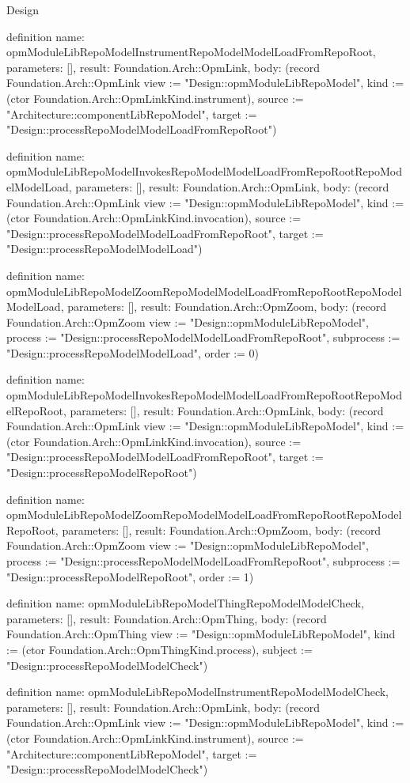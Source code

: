 \begin{lexlean}{Design}
\begin{semanticmodule}
definition{
  name: opmModuleLibRepoModelInstrumentRepoModelModelLoadFromRepoRoot,
  parameters: [],
  result: Foundation.Arch::OpmLink,
  body: (record Foundation.Arch::OpmLink {view := "Design::opmModuleLibRepoModel", kind := (ctor Foundation.Arch::OpmLinkKind.instrument), source := "Architecture::componentLibRepoModel", target := "Design::processRepoModelModelLoadFromRepoRoot"})
}

definition{
  name: opmModuleLibRepoModelInvokesRepoModelModelLoadFromRepoRootRepoModelModelLoad,
  parameters: [],
  result: Foundation.Arch::OpmLink,
  body: (record Foundation.Arch::OpmLink {view := "Design::opmModuleLibRepoModel", kind := (ctor Foundation.Arch::OpmLinkKind.invocation), source := "Design::processRepoModelModelLoadFromRepoRoot", target := "Design::processRepoModelModelLoad"})
}

definition{
  name: opmModuleLibRepoModelZoomRepoModelModelLoadFromRepoRootRepoModelModelLoad,
  parameters: [],
  result: Foundation.Arch::OpmZoom,
  body: (record Foundation.Arch::OpmZoom {view := "Design::opmModuleLibRepoModel", process := "Design::processRepoModelModelLoadFromRepoRoot", subprocess := "Design::processRepoModelModelLoad", order := 0})
}

definition{
  name: opmModuleLibRepoModelInvokesRepoModelModelLoadFromRepoRootRepoModelRepoRoot,
  parameters: [],
  result: Foundation.Arch::OpmLink,
  body: (record Foundation.Arch::OpmLink {view := "Design::opmModuleLibRepoModel", kind := (ctor Foundation.Arch::OpmLinkKind.invocation), source := "Design::processRepoModelModelLoadFromRepoRoot", target := "Design::processRepoModelRepoRoot"})
}

definition{
  name: opmModuleLibRepoModelZoomRepoModelModelLoadFromRepoRootRepoModelRepoRoot,
  parameters: [],
  result: Foundation.Arch::OpmZoom,
  body: (record Foundation.Arch::OpmZoom {view := "Design::opmModuleLibRepoModel", process := "Design::processRepoModelModelLoadFromRepoRoot", subprocess := "Design::processRepoModelRepoRoot", order := 1})
}

definition{
  name: opmModuleLibRepoModelThingRepoModelModelCheck,
  parameters: [],
  result: Foundation.Arch::OpmThing,
  body: (record Foundation.Arch::OpmThing {view := "Design::opmModuleLibRepoModel", kind := (ctor Foundation.Arch::OpmThingKind.process), subject := "Design::processRepoModelModelCheck"})
}

definition{
  name: opmModuleLibRepoModelInstrumentRepoModelModelCheck,
  parameters: [],
  result: Foundation.Arch::OpmLink,
  body: (record Foundation.Arch::OpmLink {view := "Design::opmModuleLibRepoModel", kind := (ctor Foundation.Arch::OpmLinkKind.instrument), source := "Architecture::componentLibRepoModel", target := "Design::processRepoModelModelCheck"})
}


\end{semanticmodule}
\end{lexlean}
